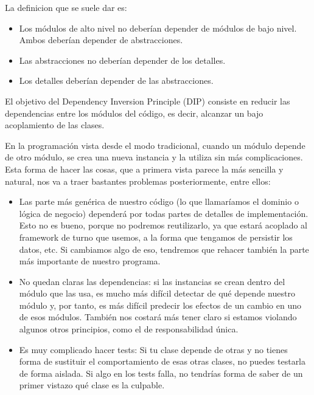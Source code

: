 \documentclass[12pt,letterpaper]{article}
\begin{document}
La definicion que se suele dar es: 

\begin{itemize}
    \item Los módulos de alto nivel no deberían depender de módulos de bajo nivel. Ambos deberían depender de abstracciones.

    \item Las abstracciones no deberían depender de los detalles. 
    
    
    
    \item Los detalles deberían depender de las abstracciones.
\end{itemize}

El objetivo del Dependency Inversion Principle (DIP) consiste en reducir las dependencias entre los módulos del código, es decir, alcanzar un bajo acoplamiento de las clases.
    
En la programación vista desde el modo tradicional, cuando un módulo depende de
otro módulo, se crea una nueva instancia y la utiliza sin más complicaciones. Esta
forma de hacer las cosas, que a primera vista parece la más sencilla y natural, nos va
a traer bastantes problemas posteriormente, entre ellos:

\begin{itemize}
    \item  Las parte más genérica de nuestro código (lo que llamaríamos el dominio
    o lógica de negocio) dependerá por todas partes de detalles de implementación. Esto no es bueno, porque no podremos reutilizarlo, ya que estará
    acoplado al framework de turno que usemos, a la forma que tengamos de
    persistir los datos, etc. Si cambiamos algo de eso, tendremos que rehacer
    también la parte más importante de nuestro programa.
    \item  No quedan claras las dependencias: si las instancias se crean dentro del
    módulo que las usa, es mucho más difícil detectar de qué depende nuestro
    módulo y, por tanto, es más difícil predecir los efectos de un cambio en uno
    de esos módulos. También nos costará más tener claro si estamos violando
    algunos otros principios, como el de responsabilidad única.
    \item Es muy complicado hacer tests: Si tu clase depende de otras y no tienes forma
    de sustituir el comportamiento de esas otras clases, no puedes testarla de forma
    aislada. Si algo en los tests falla, no tendrías forma de saber de un primer vistazo
    qué clase es la culpable.
    
\end{itemize}
\end{document}
